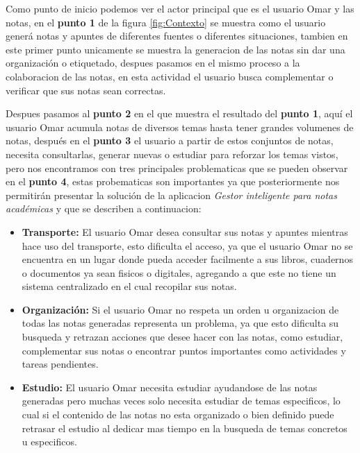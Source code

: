 \vspace{.5cm}

Como punto de inicio podemos ver el actor principal que es el usuario Omar y las notas, en el \textbf{punto 1} de la figura \ref{fig:Contexto} se muestra como el usuario generá notas y apuntes de diferentes fuentes o diferentes situaciones, tambien en este primer punto unicamente se muestra la generacion de las notas sin dar una organización o etiquetado, despues pasamos en el mismo proceso a la colaboracion de las notas, en esta actividad el usuario busca complementar o verificar que sus notas sean correctas.

\vspace{.5cm}

Despues pasamos al \textbf{punto 2} en el que muestra el resultado del \textbf{punto 1}, aquí el usuario Omar acumula notas de diversos temas hasta tener grandes volumenes de notas, después en el \textbf{punto 3} el usuario a partir de estos conjuntos de notas, necesita consultarlas, generar nuevas o estudiar para reforzar los temas vistos, pero nos encontramos con tres principales problematicas que se pueden observar en el \textbf{punto 4}, estas probematicas son importantes ya que posteriormente nos permitirán presentar la solución de la aplicacion \emph{Gestor inteligente para notas académicas} y que se describen a continuacion:

\begin{itemize}
    \item \textbf{Transporte:} El usuario Omar desea consultar sus notas y apuntes mientras hace uso del transporte, esto dificulta el acceso, ya que el usuario Omar no se encuentra en un lugar donde pueda acceder facilmente a sus libros, cuadernos o documentos ya sean fisicos o digitales, agregando a que este no tiene un sistema centralizado en el cual recopilar sus notas.

    \item \textbf{Organización:} Si el usuario Omar no respeta un orden u organizacion de todas las notas generadas representa un problema, ya que esto dificulta su busqueda y retrazan acciones que desee hacer con las notas, como estudiar, complementar sus notas o encontrar puntos importantes como actividades y tareas pendientes.

    \item \textbf{Estudio:} El usuario Omar necesita estudiar ayudandose de las notas generadas pero muchas veces solo necesita estudiar de temas especificos, lo cual si el contenido de las notas no esta organizado o bien definido puede retrasar el estudio al dedicar mas tiempo en la busqueda de temas concretos u especificos.
\end{itemize}


